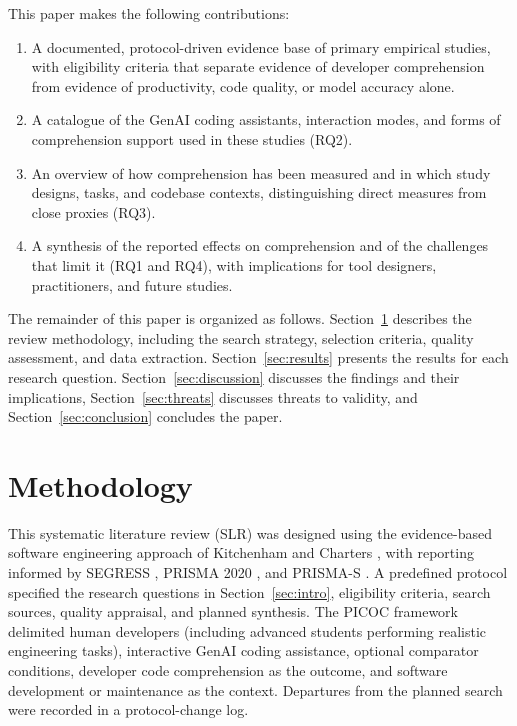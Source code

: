\documentclass[conference]{IEEEtran}
\begin{document}
This paper makes the following contributions:
\begin{enumerate}
\item A documented, protocol-driven evidence base of primary empirical studies, with eligibility criteria that separate evidence of developer comprehension from evidence of productivity, code quality, or model accuracy alone.
\item A catalogue of the GenAI coding assistants, interaction modes, and forms of comprehension support used in these studies (RQ2).
\item An overview of how comprehension has been measured and in which study designs, tasks, and codebase contexts, distinguishing direct measures from close proxies (RQ3).
\item A synthesis of the reported effects on comprehension and of the challenges that limit it (RQ1 and RQ4), with implications for tool designers, practitioners, and future studies.
\end{enumerate}

The remainder of this paper is organized as follows. Section~\ref{sec:method} describes the review methodology, including the search strategy, selection criteria, quality assessment, and data extraction. Section~\ref{sec:results} presents the results for each research question. Section~\ref{sec:discussion} discusses the findings and their implications, Section~\ref{sec:threats} discusses threats to validity, and Section~\ref{sec:conclusion} concludes the paper.

\section{Methodology}\label{sec:method}

This systematic literature review (SLR) was designed using the evidence-based software engineering approach of Kitchenham and Charters \cite{kitchenham2007}, with reporting informed by SEGRESS \cite{segress2023}, PRISMA 2020 \cite{page2021}, and PRISMA-S \cite{prismaS2021}. A predefined protocol specified the research questions in Section~\ref{sec:intro}, eligibility criteria, search sources, quality appraisal, and planned synthesis. The PICOC framework delimited human developers (including advanced students performing realistic engineering tasks), interactive GenAI coding assistance, optional comparator conditions, developer code comprehension as the outcome, and software development or maintenance as the context. Departures from the planned search were recorded in a protocol-change log.
\end{document}

